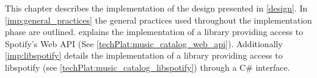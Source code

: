 This chapter describes the implementation of the design presented in \cref{design}. In \cref{imp:general_practices} the general practices used throughout the implementation phase are outlined.  explains the implementation of a library providing access to Spotify's Web API (See \cref{techPlat:music_catalog_web_api}). Additionally \cref{imp:libspotify} details the implementation of a library providing access to libspotify (see \cref{techPlat:music_catalog_libspotify}) through a C\# interface.
